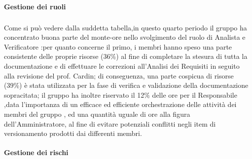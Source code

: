 \paragraph{Gestione dei ruoli}
\subparagraph{}
Come si può vedere dalla suddetta tabella,in questo quarto periodo il gruppo ha concentrato buona parte del monte-ore nello svolgimento
del ruolo di Analista e Verificatore :per quanto concerne il primo, i membri hanno speso una parte consistente delle proprie
risorse  (36\%) al fine di completare la stesura di tutta la documentazione e di effettuare le correzioni all'Analisi dei Requisiti
in seguito alla revisione del prof. Cardin; di conseguenza, una parte cospicua di risorse (39\%) è stata utilizzata per la fase di verifica 
e validazione della documentazione sopracitata; il gruppo ha inoltre riservato il 12\% delle ore per il Responsabile ,data l'importanza di un efficace
ed efficiente orchestrazione delle attività dei membri del gruppo , ed una quantità uguale di ore alla figura dell'Amministratore, al fine
di evitare potenziali conflitti negli item di versionamento prodotti dai differenti membri.

\paragraph{Gestione dei rischi}
